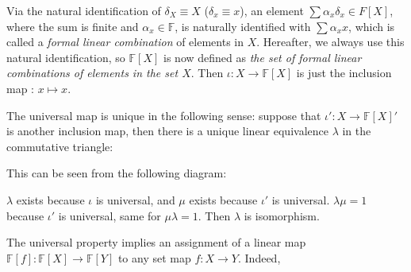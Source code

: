 \documentclass[
	11pt, %
	fleqn, %
	a4paper, %
]{LegrandOrangeBook}
\newcommand{\F}{\mathbb{F}} %
\begin{document}
Via the natural identification of $\delta_X \equiv X$ ($\delta_x \equiv x$), an element $\sum \alpha_x \delta_x \in F[X]$, where the sum is finite and $\alpha_x \in \F$, is naturally identified with $\sum \alpha_x x$, which is called a \emph{formal linear combination} of elements in $X$. Hereafter, we always use this natural identification, so $\F[X]$ is now defined as \emph{the set of formal linear combinations of elements in the set $X$}. Then $\iota : X \to \F[X]$ is just the inclusion map : $x \mapsto x$.

The universal map is unique in the following sense: suppose that $\iota' : X \to \F[X]'$ is another inclusion map, then there is a unique linear equivalence $\lambda$ in the commutative triangle:
\begin{center}
\end{center}

This can be seen from the following diagram:
\begin{center}
\end{center}
$\lambda$ exists because $\iota$ is universal, and $\mu$ exists because $\iota'$ is universal. $\lambda \mu = 1$ because $\iota'$ is universal, same for $\mu \lambda = 1$. Then $\lambda$ is isomorphism.

The universal property implies an assignment of a linear map $\F[f] : \F[X] \to \F[Y]$ to any set map $f : X \to Y$. Indeed,
\begin{center}
\end{center}
\end{document}
